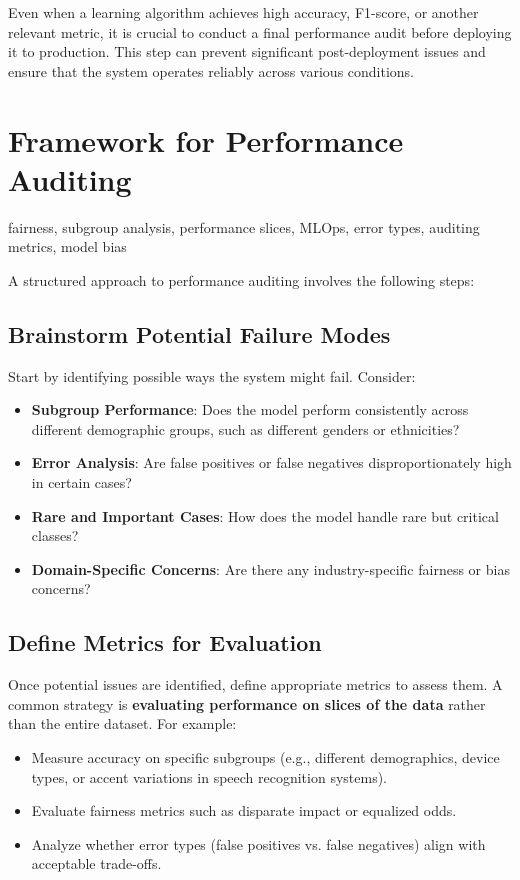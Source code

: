 \documentclass[12pt,openany]{book}
\begin{document}
Even when a learning algorithm achieves high accuracy, F1-score, or another relevant metric, it is crucial to conduct a final performance audit before deploying it to production. This step can prevent significant post-deployment issues and ensure that the system operates reliably across various conditions. 



\section{Framework for Performance Auditing}

\begin{keywordsbox}
fairness, subgroup analysis, performance slices, MLOps, error types, auditing metrics, model bias
\end{keywordsbox}

A structured approach to performance auditing involves the following steps:

\subsection{Brainstorm Potential Failure Modes}
Start by identifying possible ways the system might fail. Consider:
\begin{itemize}
    \item \textbf{Subgroup Performance}: Does the model perform consistently across different demographic groups, such as different genders or ethnicities?
    \item \textbf{Error Analysis}: Are false positives or false negatives disproportionately high in certain cases?
    \item \textbf{Rare and Important Cases}: How does the model handle rare but critical classes?
    \item \textbf{Domain-Specific Concerns}: Are there any industry-specific fairness or bias concerns?
\end{itemize}

\subsection{Define Metrics for Evaluation}
Once potential issues are identified, define appropriate metrics to assess them. A common strategy is \textbf{evaluating performance on slices of the data} rather than the entire dataset. For example:
\begin{itemize}
    \item Measure accuracy on specific subgroups (e.g., different demographics, device types, or accent variations in speech recognition systems).
    \item Evaluate fairness metrics such as disparate impact or equalized odds.
    \item Analyze whether error types (false positives vs. false negatives) align with acceptable trade-offs.
\end{itemize}
\end{document}
